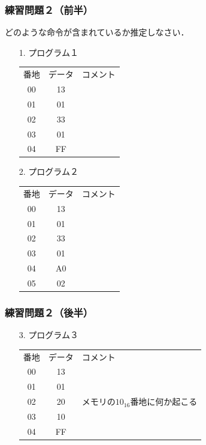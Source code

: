 \documentclass[handout]{beamer}         %
\begin{document}
\begin{frame}
  \frametitle{練習問題２（前半）}
  どのような命令が含まれているか推定しなさい．
  \begin{enumerate}
    \item[1.] プログラム１\\
      \begin{tabular}{c c l}
        番地 & データ & コメント \\
        00   & 13     &          \\
        01   & 01     &          \\
        02   & 33     &          \\
        03   & 01     &          \\
        04   & FF     &          \\
      \end{tabular}
    \item[2.] プログラム２\\
      \begin{tabular}{c c l}
        番地 & データ & コメント \\
        00   & 13     &          \\
        01   & 01     &          \\
        02   & 33     &          \\
        03   & 01     &          \\
        04   & A0     &          \\
        05   & 02     &          \\
      \end{tabular}
  \end{enumerate}
\end{frame}

\begin{frame}
  \frametitle{練習問題２（後半）}
  \begin{enumerate}
    \item[3.] プログラム３\\
      \begin{tabular}{c c l}
        番地 & データ & コメント \\
        00   & 13     &          \\
        01   & 01     &          \\
        02   & 20     &  メモリの$10_{16}$番地に何か起こる \\
        03   & 10     &          \\
        04   & FF     &          \\
      \end{tabular}
  \end{enumerate}
  \vfill
\end{frame}
\end{document}
